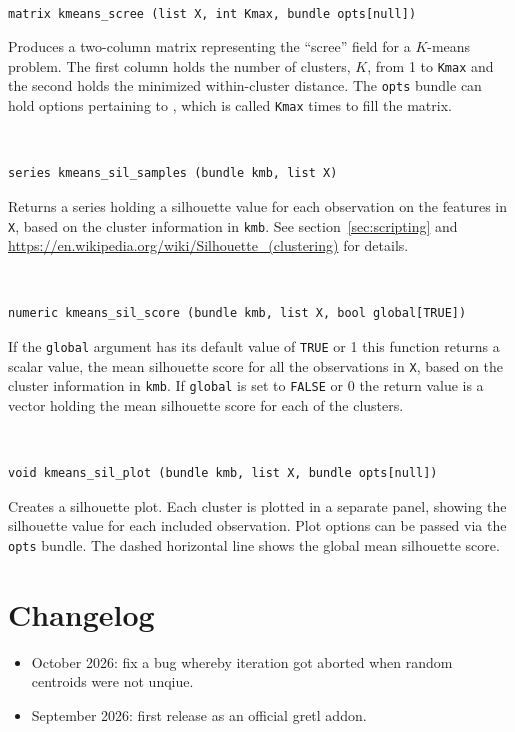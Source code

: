 \documentclass{article}
\newenvironment{funcdoc}
{\noindent\hrulefill\\[-12pt]}
{\medbreak}
\begin{document}
\begin{funcdoc}
\begin{verbatim}
matrix kmeans_scree (list X, int Kmax, bundle opts[null])
\end{verbatim}
  Produces a two-column matrix representing the ``scree'' field for a
  $K$-means problem.  The first column holds the number of clusters,
  $K$, from 1 to \texttt{Kmax} and the second holds the minimized
  within-cluster distance. The \texttt{opts} bundle can hold options
  pertaining to , which is called \texttt{Kmax} times to
  fill the matrix.
\end{funcdoc}

\begin{funcdoc}
\begin{verbatim}
series kmeans_sil_samples (bundle kmb, list X)
\end{verbatim}
  Returns a series holding a silhouette value for each observation on
  the features in \texttt{X}, based on the cluster information in
  \texttt{kmb}. See section~\ref{sec:scripting} and
  \url{https://en.wikipedia.org/wiki/Silhouette_(clustering)} for
  details.
\end{funcdoc}

\begin{funcdoc}
\begin{verbatim}
numeric kmeans_sil_score (bundle kmb, list X, bool global[TRUE])
\end{verbatim}
  If the \texttt{global} argument has its default value of \texttt{TRUE}
  or 1 this function returns a scalar value, the mean silhouette score
  for all the observations in \texttt{X}, based on the cluster
  information in \texttt{kmb}. If \texttt{global} is set to
  \texttt{FALSE} or 0 the return value is a vector holding the mean
  silhouette score for each of the clusters.
\end{funcdoc}

\begin{funcdoc}
\begin{verbatim}
void kmeans_sil_plot (bundle kmb, list X, bundle opts[null])
\end{verbatim}
  Creates a silhouette plot. Each cluster is plotted in a separate
  panel, showing the silhouette value for each included
  observation. Plot options can be passed via the \texttt{opts}
  bundle. The dashed horizontal line shows the global mean silhouette
  score.
\end{funcdoc}




\section{Changelog}

\begin{itemize}
\item October 2026: fix a bug whereby iteration got aborted when random
  centroids were not unqiue.
\item September 2026: first release as an official gretl addon.
\end{itemize}

\end{document}
